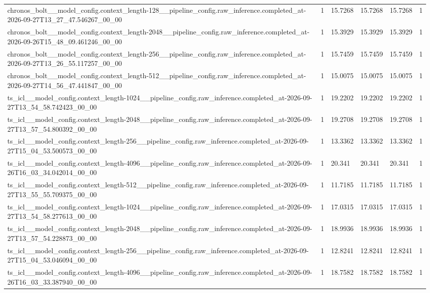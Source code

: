 \begin{tabular}{llllll}
chronos\_bolt\_\_model\_config.context\_length-128\_\_pipeline\_config.raw\_inference.completed\_at-2026-09-27T13\_27\_47.546267\_00\_00 & 1 & 15.7268 & 15.7268 & 15.7268 & 1 \\
chronos\_bolt\_\_model\_config.context\_length-2048\_\_pipeline\_config.raw\_inference.completed\_at-2026-09-26T15\_48\_09.461246\_00\_00 & 1 & 15.3929 & 15.3929 & 15.3929 & 1 \\
chronos\_bolt\_\_model\_config.context\_length-256\_\_pipeline\_config.raw\_inference.completed\_at-2026-09-27T13\_26\_55.117257\_00\_00 & 1 & 15.7459 & 15.7459 & 15.7459 & 1 \\
chronos\_bolt\_\_model\_config.context\_length-512\_\_pipeline\_config.raw\_inference.completed\_at-2026-09-27T14\_56\_47.441847\_00\_00 & 1 & 15.0075 & 15.0075 & 15.0075 & 1 \\
ts\_icl\_\_model\_config.context\_length-1024\_\_pipeline\_config.raw\_inference.completed\_at-2026-09-27T13\_54\_58.742423\_00\_00 & 1 & 19.2202 & 19.2202 & 19.2202 & 1 \\
ts\_icl\_\_model\_config.context\_length-2048\_\_pipeline\_config.raw\_inference.completed\_at-2026-09-27T13\_57\_54.800392\_00\_00 & 1 & 19.2708 & 19.2708 & 19.2708 & 1 \\
ts\_icl\_\_model\_config.context\_length-256\_\_pipeline\_config.raw\_inference.completed\_at-2026-09-27T15\_04\_53.500573\_00\_00 & 1 & 13.3362 & 13.3362 & 13.3362 & 1 \\
ts\_icl\_\_model\_config.context\_length-4096\_\_pipeline\_config.raw\_inference.completed\_at-2026-09-26T16\_03\_34.042014\_00\_00 & 1 & 20.341 & 20.341 & 20.341 & 1 \\
ts\_icl\_\_model\_config.context\_length-512\_\_pipeline\_config.raw\_inference.completed\_at-2026-09-27T13\_55\_55.709375\_00\_00 & 1 & 11.7185 & 11.7185 & 11.7185 & 1 \\
ts\_icl\_\_model\_config.context\_length-1024\_\_pipeline\_config.raw\_inference.completed\_at-2026-09-27T13\_54\_58.277613\_00\_00 & 1 & 17.0315 & 17.0315 & 17.0315 & 1 \\
ts\_icl\_\_model\_config.context\_length-2048\_\_pipeline\_config.raw\_inference.completed\_at-2026-09-27T13\_57\_54.228873\_00\_00 & 1 & 18.9936 & 18.9936 & 18.9936 & 1 \\
ts\_icl\_\_model\_config.context\_length-256\_\_pipeline\_config.raw\_inference.completed\_at-2026-09-27T15\_04\_53.046094\_00\_00 & 1 & 12.8241 & 12.8241 & 12.8241 & 1 \\
ts\_icl\_\_model\_config.context\_length-4096\_\_pipeline\_config.raw\_inference.completed\_at-2026-09-26T16\_03\_33.387940\_00\_00 & 1 & 18.7582 & 18.7582 & 18.7582 & 1 \\

\end{tabular}
